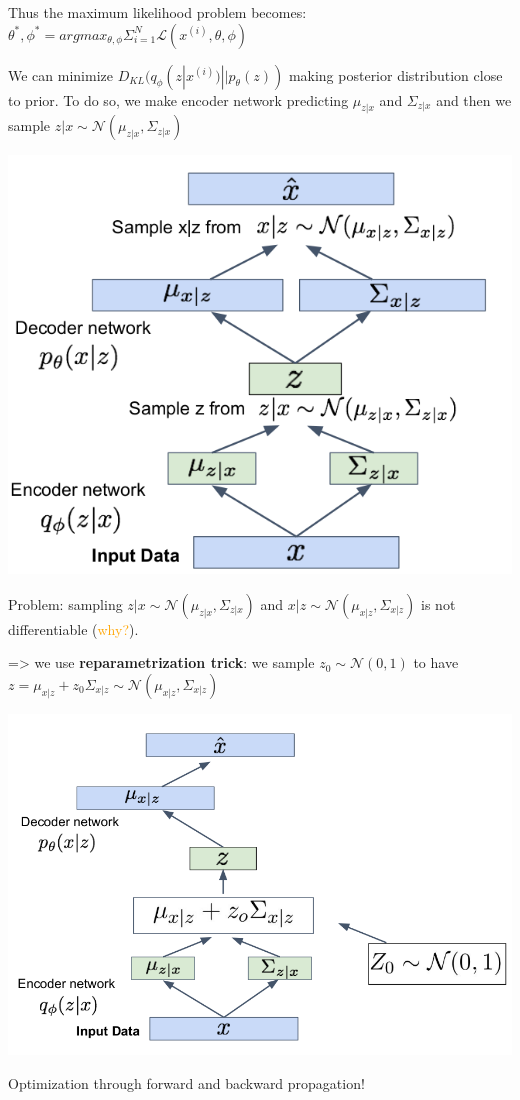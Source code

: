 Thus the maximum likelihood problem becomes: $\theta^*, \phi^* = argmax_{\theta, \phi} \Sigma_{i=1}^N \mathcal{L}(x^{(i)}, \theta, \phi)$

\vspace{5mm}

We can minimize $D_{KL}(q_\phi(z | x^{(i)}) || p_\theta(z))$ making posterior distribution close to prior. To do so, we make encoder network predicting $\mu_{z | x}$ and $\Sigma_{z | x}$ and then we sample $z | x \sim \mathcal{N}(\mu_{z | x}, \Sigma_{z | x})$

\begin{center}
\includegraphics[scale=0.4]{VAE_final_schema.png}
\end{center}

Problem: sampling $z | x \sim \mathcal{N}(\mu_{z | x}, \Sigma_{z | x})$ and $x | z \sim \mathcal{N}(\mu_{x | z}, \Sigma_{x | z})$ is not differentiable (\textcolor{orange}{why?}).

=> we use \textbf{reparametrization trick}: we sample $z_0 \sim \mathcal{N}(0,1)$ to have $z = \mu_{x | z} + z_0 \Sigma_{x | z} \sim \mathcal{N}(\mu_{x | z}, \Sigma_{x | z})$

\begin{center}
\includegraphics[scale=0.4]{VAE_reparametrization_trick.png}
\end{center}

Optimization through forward and backward propagation!